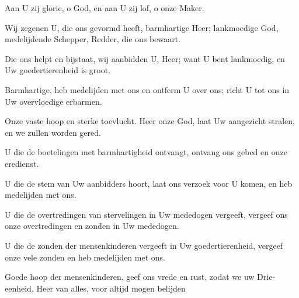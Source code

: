 \documentclass[12pt,twoside,a5paper]{article}
\begin{document}


\begin{halfparskip}
   Aan U zij glorie, o God, en aan U zij lof, o onze Maker.

  Wij zegenen U, die ons gevormd heeft, barmhartige Heer; lankmoedige God, medelijdende Schepper, Redder, die ons bewaart.

  Die ons helpt en bijstaat, wij aanbidden U, Heer; want U bent lankmoedig, en Uw goedertierenheid is groot.

  Barmhartige, heb medelijden met ons en ontferm U over ons; richt U tot ons in Uw overvloedige erbarmen.

  Onze vaste hoop en sterke toevlucht. Heer onze God, laat Uw aangezicht stralen, en we zullen worden gered.

  U die de boetelingen met barmhartigheid ontvangt, ontvang ons gebed en onze eredienst.

  U die de stem van Uw aanbidders hoort, laat ons verzoek voor U komen, en heb medelijden met ons.

  U die de overtredingen van stervelingen in Uw mededogen vergeeft, vergeef ons onze overtredingen en zonden in Uw mededogen.

  U die de zonden der mensenkinderen vergeeft in Uw goedertierenheid, vergeef onze vele zonden en heb medelijden met ons.

  Goede hoop der mensenkinderen, geef ons vrede en rust, zodat we uw Drie-eenheid, Heer van alles, voor altijd mogen belijden 
\end{halfparskip}

\begin{halfparskip}
\end{halfparskip}
\end{document}
